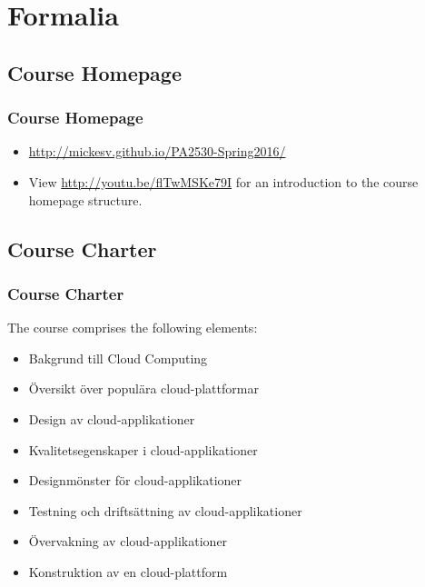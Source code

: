\documentclass[10pt]{beamer}
\begin{document}
\section{Formalia}
\subsection{Course Homepage}
\begin{frame}[t]
\frametitle{Course Homepage}
\begin{itemize}
\item \url{http://mickesv.github.io/PA2530-Spring2016/}
\item View \url{http://youtu.be/flTwMSKe79I} for an introduction to the course homepage structure.
\end{itemize}
\end{frame}


\subsection{Course Charter}
\begin{frame}[t]
\frametitle{Course Charter}
The course comprises the following elements: 
\begin{itemize}

\item Bakgrund till Cloud Computing
\item Översikt över populära cloud-plattformar
\item Design av cloud-applikationer
\item Kvalitetsegenskaper i cloud-applikationer
\item Designmönster för cloud-applikationer
\item Testning och driftsättning av cloud-applikationer
\item Övervakning av cloud-applikationer
\item Konstruktion av en cloud-plattform
\end{itemize}

\end{frame}
\end{document}

